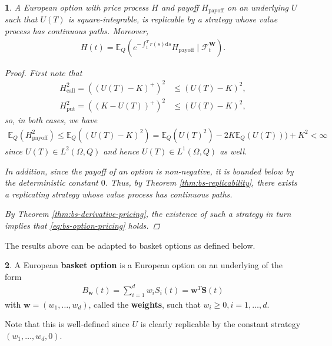 \documentclass[english]{article}
\numberwithin{equation}{section}
\numberwithin{figure}{section}
\theoremstyle{bolddescit}
\newtheorem{theorem}{\protect\theoremname}[section]
\theoremstyle{definition}
\newtheorem{definition}[theorem]{\protect\definitionname}
\theoremstyle{definition}
\theoremstyle{plain}
\theoremstyle{plain}
\theoremstyle{bolddesc}
\theoremstyle{plain}
\theoremstyle{remark}
\providecommand{\definitionname}{Definition}
\providecommand{\theoremname}{Theorem}
\begin{document}
\begin{theorem}\label{thm:bs-option-pricing}
  A European option with price process $H$ and payoff $H_\text{payoff}$ on an underlying $U$ such that $U(T)$ is square-integrable, is replicable by a strategy whose value process has continuous paths. Moreover,
  \begin{align}\label{eq:bs-option-pricing}
    H(t) = \mathbb{E}_Q\left(e^{-\int_t^T r(s) \mathrm{d}s} H_\text{payoff} \mid \mathcal{F}^\mathbf{W}_t\right).
  \end{align}

  \begin{proof}
    First note that
    \begin{align*}
      H_\text{call}^2 = ((U(T) - K)^+)^2 &\le (U(T) - K)^2,\\
      H_\text{put}^2 = ((K - U(T))^+)^2 &\le (U(T) - K)^2,
    \end{align*}
    so, in both cases, we have
    \begin{align*}
      \mathbb{E}_Q(H_\text{payoff}^2)
      \le \mathbb{E}_Q((U(T) - K)^2)
      = \mathbb{E}_Q(U(T)^2) - 2K\mathbb{E}_Q(U(T))) + K^2
      < \infty
    \end{align*}
    since $U(T) \in L^2(\Omega, Q)$ and hence $U(T) \in L^1(\Omega, Q)$ as well.

    In addition, since the payoff of an option is non-negative, it is bounded below by the deterministic constant $0$. Thus, by Theorem \ref{thm:bs-replicability}, there exists a replicating strategy whose value process has continuous paths.

    By Theorem \ref{thm:bs-derivative-pricing}, the existence of such a strategy in turn implies that \eqref{eq:bs-option-pricing} holds.
  \end{proof}
\end{theorem}

The results above can be adapted to basket options as defined below.

\begin{definition}
  A European \textbf{basket option} is a European option on an underlying of the form
  \begin{align*}
    B_\mathbf{w}(t) = \sum_{i=1}^{d} w_i S_i(t) = \mathbf{w}^T \mathbf{S}(t)
  \end{align*}
  with $\mathbf{w} = (w_1, \ldots, w_d)$, called the \textbf{weights}, such that $w_i \ge 0, i=1,\ldots,d$.
\end{definition}

Note that this is well-defined since $U$ is clearly replicable by the constant strategy $(w_1, \ldots, w_d, 0)$.
\end{document}
